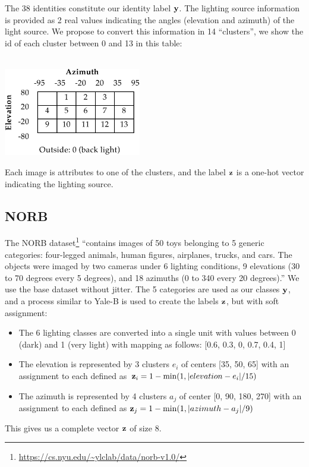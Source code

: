 The 38 identities constitute our identity label $\mathbf{y}$. The lighting source information is provided as 2 real values indicating the angles (elevation and azimuth) of the light source. We propose to convert this information in 14 ``clusters'', we show the id of each cluster between 0 and 13 in this table:\\
~\\
\begin{center}
    \includegraphics[width=0.45\textwidth]{images/dualdis_S_yale_cluster.pdf}
\end{center}
Each image is attributes to one of the clusters, and the label $\mathbf{z}$ is a one-hot vector indicating the lighting source.

\subsection{NORB}

The NORB dataset\footnote{\url{https://cs.nyu.edu/~ylclab/data/norb-v1.0/}} ``contains images of 50 toys belonging to 5 generic categories: four-legged animals, human figures, airplanes, trucks, and cars. The objects were imaged by two cameras under 6 lighting conditions, 9 elevations (30 to 70 degrees every 5 degrees), and 18 azimuths (0 to 340 every 20 degrees).'' We use the base dataset without jitter. The 5 categories are used as our classes $\mathbf{y}$, and a process similar to Yale-B is used to create the labels $\mathbf{z}$, but with soft assignment:
\begin{itemize}
	\item The 6 lighting classes are converted into a single unit with values between 0 (dark) and 1 (very light) with mapping as follows: [0.6, 0.3, 0, 0.7, 0.4, 1]
	\item The elevation is represented by 3 clusters $e_i$ of centers [35, 50, 65] with an assignment to each defined as $\mathbf{z}_i = 1 - \min(1, |elevation - e_i| / 15)$
	\item The azimuth is represented by 4 clusters $a_j$ of center [0, 90, 180, 270] with an assignment to each defined as $\mathbf{z}_j = 1 - \min(1, |azimuth - a_j| / 9)$
\end{itemize}
This gives us a complete vector $\mathbf{z}$ of size 8.

